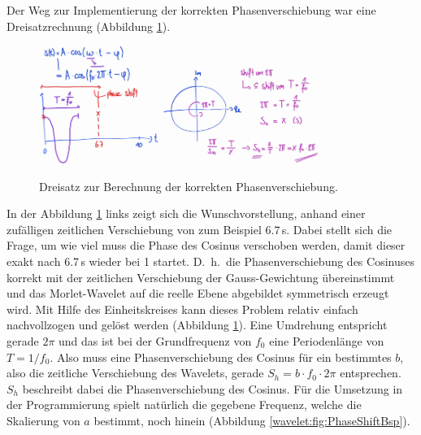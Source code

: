 Der Weg zur Implementierung der korrekten Phasenverschiebung war
eine Dreisatzrechnung (Abbildung \ref{wavelet:fig:PhaseCalc}).
\begin{figure}
	\centering
	\includegraphics[width=0.35\textwidth]{papers/wavelets/images/10-1_PhaseCalc1.png}
	\includegraphics[width=0.45\textwidth]{papers/wavelets/images/10-2_PhaseCalc2.png}
	\caption{Dreisatz zur Berechnung der korrekten Phasenverschiebung.}
	\label{wavelet:fig:PhaseCalc}
\end{figure}
In der Abbildung \ref{wavelet:fig:PhaseCalc} links zeigt sich die
Wunschvorstellung, anhand einer zufälligen zeitlichen Verschiebung
von zum Beispiel 6.7\,s.
Dabei stellt sich die Frage, um wie viel muss die Phase des Cosinus
verschoben werden, damit dieser exakt nach 6.7\,s wieder bei 1 startet.
D.~h.~die Phasenverschiebung des Cosinuses korrekt mit der zeitlichen
Verschiebung der Gauss-Gewichtung übereinstimmt und das Morlet-Wavelet
auf die reelle Ebene abgebildet symmetrisch erzeugt wird.
Mit Hilfe des Einheitskreises kann dieses Problem relativ einfach
nachvollzogen und gelöst werden (Abbildung \ref{wavelet:fig:PhaseCalc}).
Eine Umdrehung entspricht gerade $2\pi$ und das ist bei der
Grundfrequenz von $f_0$ eine Periodenlänge von $T=1/f_0$. Also muss
eine Phasenverschiebung des Cosinus für ein bestimmtes $b$, also
die zeitliche Verschiebung des Wavelets, gerade $S_h=b\cdot f_0\cdot
2\pi$ entsprechen. $S_h$ beschreibt dabei die Phasenverschiebung
des Cosinus.
Für die Umsetzung in der Programmierung spielt natürlich die gegebene
Frequenz, welche die Skalierung von $a$ bestimmt, noch hinein
(Abbildung \ref{wavelet:fig:PhaseShiftBsp}).

